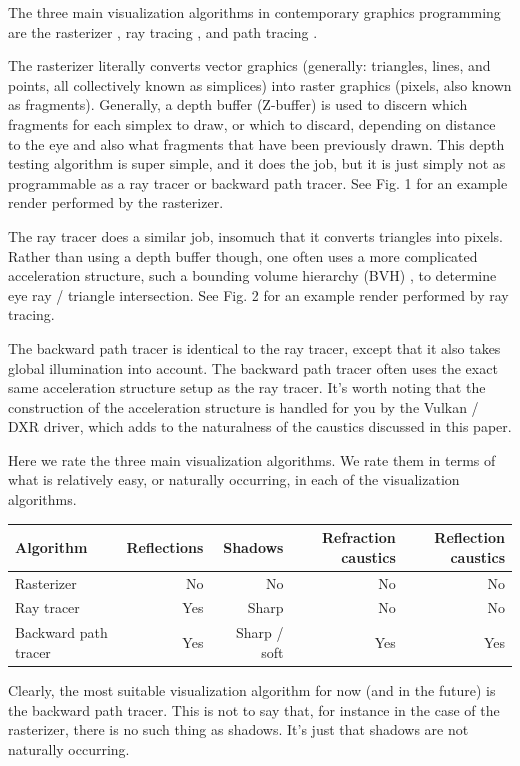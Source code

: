 \documentclass[12pt]{article}
\begin{document}
The three main visualization algorithms in contemporary graphics programming are the rasterizer \cite{noll, wikipedia1}, ray tracing \cite{appel, wikipedia2}, and path tracing \cite{kajiya, wikipedia3}.

The rasterizer literally converts vector graphics (generally: triangles, lines, and points, all collectively known as simplices) into raster graphics (pixels, also known as fragments).
Generally, a depth buffer (Z-buffer) \cite{wikipedia4} is used to discern which fragments for each simplex to draw, or which to discard, depending on distance to the eye and also what fragments that have been previously drawn.
This depth testing algorithm is super simple, and it does the job, but it is just simply not as programmable as a ray tracer or backward path tracer.
See Fig. 1 for an example render performed by the rasterizer.

The ray tracer does a similar job, insomuch that it converts triangles into pixels.
Rather than using a depth buffer though, one often uses a more complicated acceleration structure, such a bounding volume hierarchy (BVH) \cite{wikipedia5}, to determine eye ray / triangle intersection.
See Fig. 2 for an example render performed by ray tracing.

The backward path tracer is identical to the ray tracer, except that it also takes global illumination into account.
The backward path tracer often uses the exact same acceleration structure setup as the ray tracer.
It's worth noting that the construction of the acceleration structure is handled for you by the Vulkan / DXR driver, which adds to the naturalness of the caustics discussed in this paper.

Here we rate the three main visualization algorithms.
We rate them in terms of what is relatively easy, or naturally occurring, in each of the visualization algorithms.
\begin{center}
\begin{tabular}{| l | r | r | r | r |}
  \hline
 Algorithm &  Reflections & Shadows & Refraction caustics & Reflection caustics \\
\hline
\hline
Rasterizer & No & No & No &  No \\
Ray tracer & Yes & Sharp & No & No  \\
Backward path tracer & Yes & Sharp / soft & Yes & Yes \\
  \hline  
\end{tabular}
\end{center}
Clearly, the most suitable visualization algorithm for now (and in the future) is the backward path tracer.
This is not to say that, for instance in the case of the rasterizer, there is no such thing as shadows.
It's just that shadows are not naturally occurring.
\end{document}
